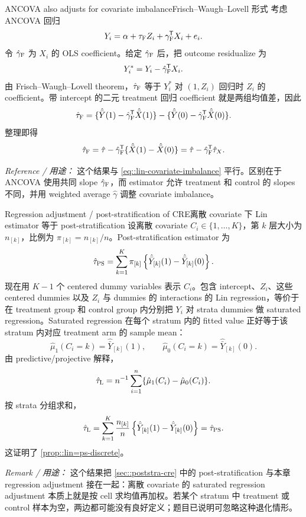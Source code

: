 \begin{exercisesolution}{ANCOVA also adjusts for covariate imbalance}{Frisch--Waugh--Lovell 形式}
考虑 ANCOVA 回归
\[
Y_i=\alpha+\tau_\textsc{F}Z_i+\gamma_\textsc{F}^{\mkern-1.5mu\mathsf{T}} X_i+e_i.
\]
令 $\hat\gamma_\textsc{F}$ 为 $X_i$ 的 OLS coefficient。给定 $\hat\gamma_\textsc{F}$ 后，把 outcome residualize 为
\[
Y_i^\ast=Y_i-\hat\gamma_\textsc{F}^{\mkern-1.5mu\mathsf{T}} X_i.
\]
由 Frisch--Waugh--Lovell theorem，$\hat\tau_\textsc{F}$ 等于 $Y_i^\ast$ 对 $(1,Z_i)$ 回归时 $Z_i$ 的 coefficient。带 intercept 的二元 treatment 回归 coefficient 就是两组均值差，因此
\[
\hat\tau_\textsc{F}
=\{ \hat{\bar Y}(1)-\hat\gamma_\textsc{F}^{\mkern-1.5mu\mathsf{T}}\hat{\bar X}(1)\}
-\{ \hat{\bar Y}(0)-\hat\gamma_\textsc{F}^{\mkern-1.5mu\mathsf{T}}\hat{\bar X}(0)\}.
\]
整理即得
\[
\hat\tau_\textsc{F}
=\hat\tau-\hat\gamma_\textsc{F}^{\mkern-1.5mu\mathsf{T}}
\{\hat{\bar X}(1)-\hat{\bar X}(0)\}
=\hat\tau-\hat\gamma_\textsc{F}^{\mkern-1.5mu\mathsf{T}}\hat\tau_X.
\]

\emph{Reference / 用途：} 这个结果与 \cref{eq::lin-covariate-imbalance} 平行。区别在于 ANCOVA 使用共同 slope $\hat\gamma_\textsc{F}$，而 \citet{lin2013} estimator 允许 treatment 和 control 的 slopes 不同，并用 weighted average $\hat\gamma$ 调整 covariate imbalance。
\end{exercisesolution}

\begin{exercisesolution}{Regression adjustment / post-stratification of CRE}{离散 covariate 下 Lin estimator 等于 post-stratification}
设离散 covariate $C_i\in\{1,\ldots,K\}$，第 $k$ 层大小为 $n_{[k]}$，比例为 $\pi_{[k]}=n_{[k]}/n$。Post-stratification estimator 为
\[
\hat\tau_\textsc{PS}
=\sum_{k=1}^K\pi_{[k]}
\left\{\hat{\bar Y}_{[k]}(1)-\hat{\bar Y}_{[k]}(0)\right\}.
\]
现在用 $K-1$ 个 centered dummy variables 表示 $C_i$。包含 intercept、$Z_i$、这些 centered dummies 以及 $Z_i$ 与 dummies 的 interactions 的 Lin regression，等价于在 treatment group 和 control group 内分别把 $Y_i$ 对 strata dummies 做 saturated regression。Saturated regression 在每个 stratum 内的 fitted value 正好等于该 stratum 内对应 treatment arm 的 sample mean：
\[
\hat\mu_1(C_i=k)=\hat{\bar Y}_{[k]}(1),\qquad
\hat\mu_0(C_i=k)=\hat{\bar Y}_{[k]}(0).
\]
由 predictive/projective 解释，
\[
\hat\tau_\textsc{L}
=n^{-1}\sum_{i=1}^n\{\hat\mu_1(C_i)-\hat\mu_0(C_i)\}.
\]
按 strata 分组求和，
\[
\hat\tau_\textsc{L}
=\sum_{k=1}^K\frac{n_{[k]}}{n}
\left\{\hat{\bar Y}_{[k]}(1)-\hat{\bar Y}_{[k]}(0)\right\}
=\hat\tau_\textsc{PS}.
\]
这证明了 \cref{prop::lin=ps-discrete}。

\emph{Remark / 用途：} 这个结果把 \cref{sec::poststra-cre} 中的 post-stratification 与本章 regression adjustment 接在一起：离散 covariate 的 saturated regression adjustment 本质上就是按 cell 求均值再加权。若某个 stratum 中 treatment 或 control 样本为空，两边都可能没有良好定义；题目已说明可忽略这种退化情形。
\end{exercisesolution}

